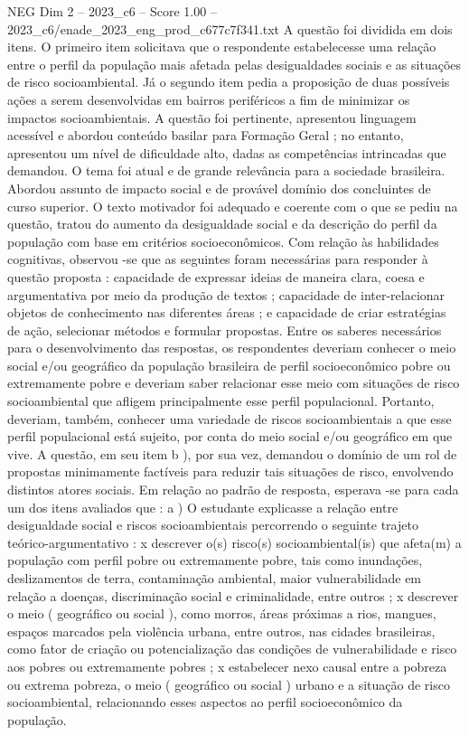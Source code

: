 \begin{textsample}{NEG Dim 2 – 2023\_c6 – Score 1.00 – 2023\_c6/enade\_2023\_eng\_prod\_c677c7f341.txt}
A questão foi dividida em dois itens.
O primeiro item solicitava que o respondente estabelecesse uma relação entre o perfil da população mais afetada pelas desigualdades sociais e as situações de risco socioambiental.
Já o segundo item pedia a proposição de duas possíveis ações a serem desenvolvidas em bairros periféricos a fim de minimizar os impactos socioambientais.
A questão foi pertinente, apresentou linguagem acessível e abordou conteúdo basilar para Formação Geral ; no entanto, apresentou um nível de dificuldade alto, dadas as competências intrincadas que demandou.
O tema foi atual e de grande relevância para a sociedade brasileira.
Abordou assunto de impacto social e de provável domínio dos concluintes de curso superior.
O texto motivador foi adequado e coerente com o que se pediu na questão, tratou do aumento da desigualdade social e da descrição do perfil da população com base em critérios socioeconômicos.
Com relação às habilidades cognitivas, observou -se que as seguintes foram necessárias para responder à questão proposta : capacidade de expressar ideias de maneira clara, coesa e argumentativa por meio da produção de textos ; capacidade de inter-relacionar objetos de conhecimento nas diferentes áreas ; e capacidade de criar estratégias de ação, selecionar métodos e formular propostas.
Entre os saberes necessários para o desenvolvimento das respostas, os respondentes deveriam conhecer o meio social e/ou geográfico da população brasileira de perfil socioeconômico pobre ou extremamente pobre e deveriam saber relacionar esse meio com situações de risco socioambiental que afligem principalmente esse perfil populacional.
Portanto, deveriam, também, conhecer uma variedade de riscos socioambientais a que esse perfil populacional está sujeito, por conta do meio social e/ou geográfico em que vive.
A questão, em seu item b ), por sua vez, demandou o domínio de um rol de propostas minimamente factíveis para reduzir tais situações de risco, envolvendo distintos atores sociais.
Em relação ao padrão de resposta, esperava -se para cada um dos itens avaliados que : a ) O estudante explicasse a relação entre desigualdade social e riscos socioambientais percorrendo o seguinte trajeto teórico-argumentativo : x descrever o(s) risco(s) socioambiental(is) que afeta(m) a população com perfil pobre ou extremamente pobre, tais como inundações, deslizamentos de terra, contaminação ambiental, maior vulnerabilidade em relação a doenças, discriminação social e criminalidade, entre outros ; x descrever o meio ( geográfico ou social ), como morros, áreas próximas a rios, mangues, espaços marcados pela violência urbana, entre outros, nas cidades brasileiras, como fator de criação ou potencialização das condições de vulnerabilidade e risco aos pobres ou extremamente pobres ; x estabelecer nexo causal entre a pobreza ou extrema pobreza, o meio ( geográfico ou social ) urbano e a situação de risco socioambiental, relacionando esses aspectos ao perfil socioeconômico da população.

\end{textsample}
